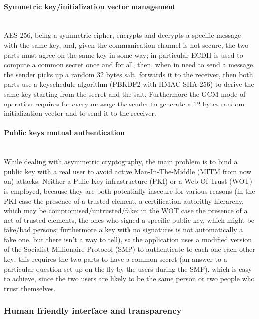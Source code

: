 \documentclass[a4paper,12pt]{article}
\begin{document}
\paragraph{Symmetric key/initialization vector management} \hspace{0pt} \\
\small{AES-256, being a symmetric cipher, encrypts and decrypts a specific message with the same key, and, given the communication channel is not secure, the two parts must agree on the same key in some way; in particular ECDH is used to compute a common secret once and for all, then, when in need to send a message, the sender picks up a random 32 bytes salt, forwards it to the receiver, then both parts use a keyschedule algorithm (PBKDF2 with HMAC-SHA-256) to derive the same key starting from the secret and the salt. Furthermore the GCM mode of operation requires for every message the sender to generate a 12 bytes random initialization vector and to send it to the receiver.}
\paragraph{Public keys mutual authentication} \hspace{0pt} \\
\small{While dealing with asymmetric cryptography, the main problem is to bind a public key with a real user to avoid active Man-In-The-Middle (MITM from now on) attacks. Neither a Pulic Key infrastructure (PKI) or a Web Of Trust (WOT) is employed, because they are both potentially insecure for various reasons (in the PKI case the presence of a trusted element, a certification autorithy hierarchy, which may be compromised/untrusted/fake; in the WOT case the presence of a net of trusted elements, the ones who signed a specific public key, which might be fake/bad persons; furthermore a key with no signatures is not automatically a fake one, but there isn't a way to tell), so the application uses a modified version of the Socialist Millionaire Protocol (SMP) to authenticate to each one each other key; this requires the two parts to have a common secret (an answer to a particular question set up on the fly by the users during the SMP), which is easy to achieve, since the two users are likely to be the same person or two people who trust themselves.}
\subsubsection{Human friendly interface and transparency}
\end{document}
